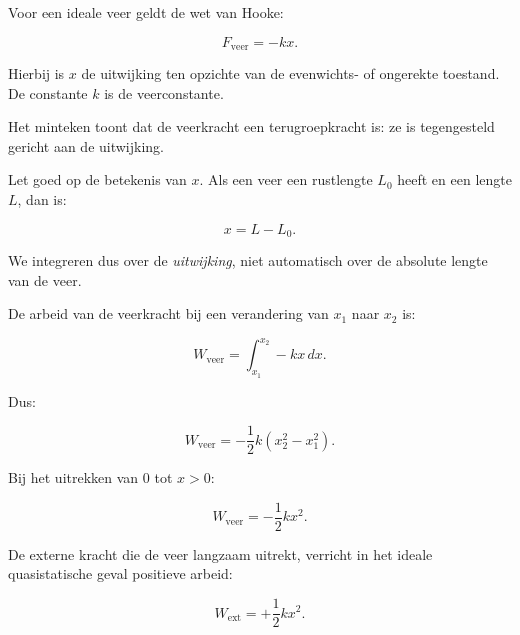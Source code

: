 \documentclass{ximera}
\begin{document}

Voor een ideale veer geldt de wet van Hooke:

\[
\boxed{
F_{\mathrm{veer}}=-kx.
}
\]

Hierbij is $x$ de uitwijking ten opzichte van de evenwichts- of ongerekte
toestand. De constante $k$ is de veerconstante.

Het minteken toont dat de veerkracht een terugroepkracht is: ze is tegengesteld
gericht aan de uitwijking.

Let goed op de betekenis van $x$. Als een veer een rustlengte $L_0$ heeft en
een lengte $L$, dan is:

\[
x=L-L_0.
\]

We integreren dus over de \emph{uitwijking}, niet automatisch over de absolute
lengte van de veer.



De arbeid van de veerkracht bij een verandering van $x_1$ naar $x_2$ is:

\[
W_{\mathrm{veer}}
=
\int_{x_1}^{x_2}-kx\,dx.
\]

Dus:

\[
\boxed{
W_{\mathrm{veer}}
=
-\frac12k(x_2^2-x_1^2).
}
\]

Bij het uitrekken van $0$ tot $x>0$:

\[
W_{\mathrm{veer}}=-\frac12kx^2.
\]

De externe kracht die de veer langzaam uitrekt, verricht in het ideale
quasistatische geval positieve arbeid:

\[
W_{\mathrm{ext}}=+\frac12kx^2.
\]
\end{document}
